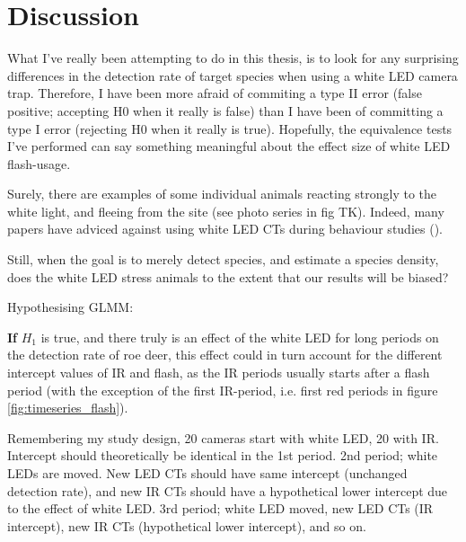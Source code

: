 \chapter{Discussion}

What I've really been attempting to do in this thesis, is to look for any surprising differences in the detection rate of target species when using a white LED camera trap. Therefore, I have been more afraid of commiting a type II error (false positive; accepting H0 when it really is false) than I have been of committing a type I error (rejecting H0 when it really is true).
Hopefully, the equivalence tests I've performed can say something meaningful about the effect size of white LED flash-usage.

Surely, there are examples of some individual animals reacting strongly to the white light, and fleeing from the site (see photo series in fig TK).
Indeed, many papers have adviced against using white LED CTs during behaviour studies ().

Still, when the goal is to merely detect species, and estimate a species density, does the white LED stress animals to the extent that our results will be biased? %















Hypothesising GLMM:

\textbf{If} $H_1$ is true, and there truly is an effect of the white LED for long periods on the detection rate of roe deer, this effect could in turn account for the different intercept values of IR and flash, as the IR periods usually starts after a flash period (with the exception of the first IR-period, i.e. first red periods in figure \vref{fig:timeseries_flash}).

Remembering my study design, 20 cameras start with white LED, 20 with IR.
Intercept should theoretically be identical in the 1st period.
2nd period; white LEDs are moved. New LED CTs should have same intercept (unchanged detection rate), and new IR CTs should have a hypothetical lower intercept due to the effect of white LED.
3rd period; white LED moved, new LED CTs (IR intercept), new IR CTs (hypothetical lower intercept), and so on.

